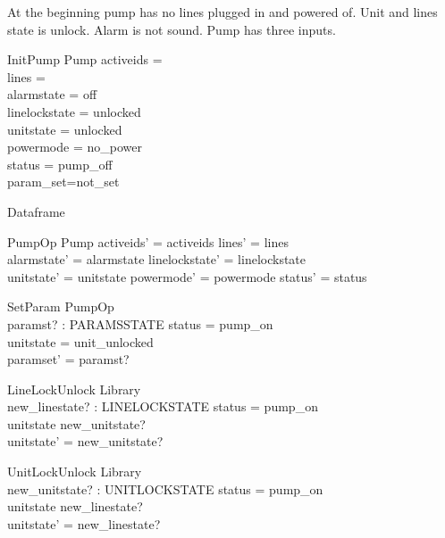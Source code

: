 \documentclass{article}
\begin{document}
	At the beginning pump has no lines plugged in and powered of.
	Unit and lines state is unlock. Alarm is not sound. 
	Pump has three inputs.	
	
	\begin{schema}{InitPump}
		Pump
		\where
		activeids = \emptyset \\
		lines = \emptyset \\
		alarmstate = off \\
		linelockstate = unlocked \\
		unitstate  = unlocked \\
		powermode =  no\_power \\
		status = pump\_off\\
		param\_set=not\_set	
	\end{schema}
	
	Dataframe
	\begin{schema}{PumpOp}
		\Delta Pump
	\where
    	activeids' = activeids \land
    	lines' = lines \land \\
    	alarmstate' = alarmstate \land 
    	linelockstate' = linelockstate \land \\
    	unitstate' = unitstate \land
    	powermode' = powermode \land
    	status' = status \\
    \end{schema}
	
	\begin{schema}{SetParam}
		PumpOp \\
		paramst? : PARAMSSTATE 
	\where
		status = pump\_on \\ 
		unitstate = unit\_unlocked \\
		paramset' = paramst?
	\end{schema}

    \begin{schema}{LineLockUnlock}
		\Delta Library \\
		new\_linestate? : LINELOCKSTATE
	\where
		status = pump\_on \\ 
		unitstate \neq new\_unitstate? \\
		unitstate' = new\_unitstate? \\		
	\end{schema}
	
    \begin{schema}{UnitLockUnlock}
		\Delta Library \\
		new\_unitstate? : UNITLOCKSTATE
	\where
		status = pump\_on \\ 
		unitstate \neq new\_linestate? \\
		unitstate' = new\_linestate? \\
	\end{schema} 	
	
\end{document}

